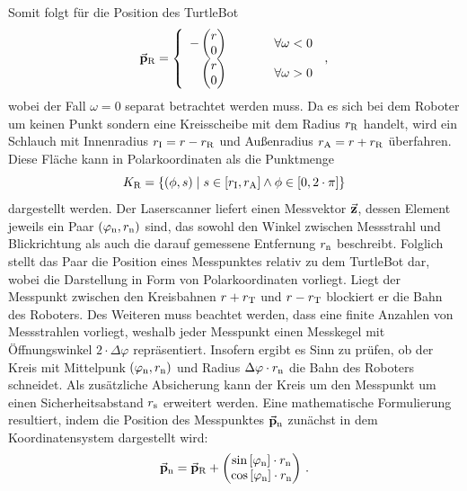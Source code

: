 Somit folgt für die Position des TurtleBot
\begin{equation}
\vec{\mathbf{p}}_{\text{R}} = \left\{\begin{array}{rl}
-\begin{pmatrix} r \\ 0 \end{pmatrix} & \hspace{1cm} \forall \omega < 0 \\
\begin{pmatrix} r \\ 0 \end{pmatrix} & \hspace{1cm} \forall \omega > 0 
\end{array}\right.\,,
\end{equation}
wobei der Fall $\omega = 0$ separat betrachtet werden muss. Da es sich bei dem Roboter um keinen Punkt sondern eine Kreisscheibe mit dem Radius $r_{\text{R}}$ handelt, wird ein Schlauch mit Innenradius $r_{\text{I}} = r - r_{\text{R}}$ und Außenradius $r_{\text{A}} = r + r_{\text{R}}$ überfahren. Diese Fläche kann in Polarkoordinaten als die Punktmenge
\begin{equation}
K_{\text{R}} = \left\{ (\phi, s) \hspace{1mm} \vert \hspace{1mm} s \in \left[r_{\text{I}},r_{\text{A}}\right] \land \phi \in \left[0, 2\cdot \pi\right]\right\} 
\end{equation}
dargestellt werden.
Der Laserscanner liefert einen Messvektor $\vec{\mathbf{z}}$, dessen Element jeweils ein Paar $(\varphi_{\text{n}}, r_{\text{n}})$ sind, das sowohl den Winkel zwischen Messstrahl und Blickrichtung als auch die darauf gemessene Entfernung $r_{\text{n}}$ beschreibt. Folglich stellt das Paar die Position eines Messpunktes relativ zu dem TurtleBot dar, wobei die Darstellung in Form von Polarkoordinaten vorliegt. Liegt der Messpunkt zwischen den Kreisbahnen $r+r_{\text{T}}$ und $r-r_{\text{T}}$ blockiert er die Bahn des Roboters. Des Weiteren muss beachtet werden, dass eine finite Anzahlen von Messstrahlen vorliegt, weshalb jeder Messpunkt einen Messkegel mit Öffnungswinkel $2\cdot \Delta\varphi$ repräsentiert. Insofern ergibt es Sinn zu prüfen, ob der Kreis mit Mittelpunk $(\varphi_{\text{n}},r_{\text{n}})$ und Radius $\Delta\varphi\cdot r_{\text{n}}$ die Bahn des Roboters schneidet. Als zusätzliche Absicherung kann der Kreis um den Messpunkt um einen Sicherheitsabstand $r_{\text{s}}$ erweitert werden. Eine mathematische Formulierung resultiert, indem die Position des Messpunktes $\vec{\mathbf{p}}_{\text{n}}$ zunächst in dem Koordinatensystem dargestellt wird:
\begin{equation}
\vec{\mathbf{p}}_{\text{n}} = \vec{\mathbf{p}}_{\text{R}} + \begin{pmatrix} \text{sin}\left[ {\varphi_{\text{n}}} \right] \cdot r_{\text{n}} \\ \text{cos}\left[ {\varphi_{\text{n}}} \right]\cdot r_{\text{n}}\end{pmatrix}\,.
\end{equation}
